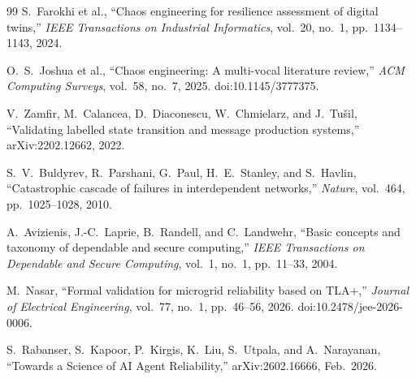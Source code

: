 \documentclass[10pt,twocolumn]{article}
\begin{document}
\begin{thebibliography}{99}
S.~Farokhi et al.,
``Chaos engineering for resilience assessment of digital twins,''
\textit{IEEE Transactions on Industrial Informatics}, vol.~20,
no.~1, pp.~1134--1143, 2024.

O.~S.~Joshua et al.,
``Chaos engineering: A multi-vocal literature review,''
\textit{ACM Computing Surveys}, vol.~58, no.~7, 2025.
doi:10.1145/3777375.

V.~Zamfir, M.~Calancea, D.~Diaconescu, W.~Chmielarz,
and J.~Tu\v{s}il,
``Validating labelled state transition and message production
systems,'' arXiv:2202.12662, 2022.

S.~V.~Buldyrev, R.~Parshani, G.~Paul, H.~E.~Stanley, and
S.~Havlin,
``Catastrophic cascade of failures in interdependent networks,''
\textit{Nature}, vol.~464, pp.~1025--1028, 2010.

A.~Avizienis, J.-C.~Laprie, B.~Randell, and C.~Landwehr,
``Basic concepts and taxonomy of dependable and secure computing,''
\textit{IEEE Transactions on Dependable and Secure Computing},
vol.~1, no.~1, pp.~11--33, 2004.

M.~Nasar,
``Formal validation for microgrid reliability based on TLA+,''
\textit{Journal of Electrical Engineering}, vol.~77, no.~1,
pp.~46--56, 2026. doi:10.2478/jee-2026-0006.

S.~Rabanser, S.~Kapoor, P.~Kirgis, K.~Liu, S.~Utpala,
and A.~Narayanan,
``Towards a Science of AI Agent Reliability,''
arXiv:2602.16666, Feb.~2026.

\end{thebibliography}
\end{document}
